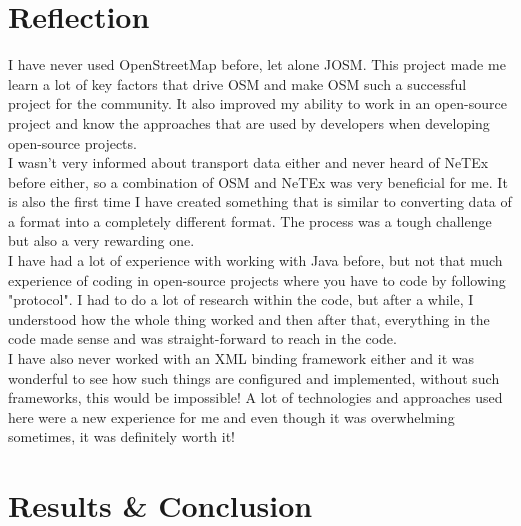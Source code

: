 \section{Reflection}
I have never used OpenStreetMap before, let alone JOSM. This project made me learn a lot of key factors that drive OSM and make OSM such a successful project for the community. It also improved my ability to work in an open-source project and know the approaches that are used by developers when developing open-source projects.\\
\newline
I wasn't very informed about transport data either and never heard of NeTEx before either, so a combination of OSM and NeTEx was very beneficial for me. It is also the first time I have created something that is similar to converting data of a format into a completely different format. The process was a tough challenge but also a very rewarding one.\\
\newline
I have had a lot of experience with working with Java before, but not that much experience of coding in open-source projects where you have to code by following "protocol". I had to do a lot of research within the code, but after a while, I understood how the whole thing worked and then after that, everything in the code made sense and was straight-forward to reach in the code.\\
\newline
I have also never worked with an XML binding framework either and it was wonderful to see how such things are configured and implemented, without such frameworks, this would be impossible! A lot of technologies and approaches used here were a new experience for me and even though it was overwhelming sometimes, it was definitely worth it!
\newpage
\section{Results \& Conclusion}
\lipsum[8-9]